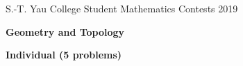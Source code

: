 \documentclass[10pt]{article}
\begin{document}



\begin{center}
S.-T. Yau College Student Mathematics Contests 2019

\vspace{0.1cm}

\Large {\bf Geometry and Topology}

\vspace{0.1cm}

\large {\bf Individual (5 problems)}

\vspace{0.1cm}
\end{center}
\end{document}
